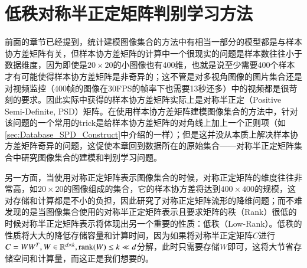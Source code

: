 \chapter{低秩对称半正定矩阵判别学习方法}
\label{chap:PSD_discrim_learning}
前面的章节已经提到，统计建模图像集合的方法中有相当一部分的模型都是与样本协方差矩阵有关，但样本协方差矩阵的计算中一个很现实的问题是样本数往往小于数据维度，因为即使是$20\times 20$的小图像也有400维，也就是说至少需要400个样本才有可能使得样本协方差矩阵是非奇异的；这不管是对多视角图像的图片集合还是对视频监控（400帧的图像在30FPS的帧率下也需要13秒还多）中的视频都是很苛刻的要求。因此实际中获得的样本协方差矩阵实际上是对称半正定（Positive Semi-Definite, PSD）矩阵。在使用样本协方差矩阵建模图像集合的方法中，针对该问题的一个常用的trick是给样本协方差矩阵的对角线上加上一个正则项（如\ref{sec:Database_SPD_Construct}中介绍的一样）；但是这并没从本质上解决样本协方差矩阵奇异的问题，这促使本章回到数据所在的原始集合——对称半正定矩阵集合中研究图像集合的建模和判别学习问题。

另一方面，当使用对称正定矩阵表示图像集合的时候，对称正定矩阵的维度往往非常高，如$20 \times 20$的图像组成的集合，它的样本协方差将达到$400\times 400$的规模，这对存储和计算都是不小的负担，因此\cite{Statistics_SPDML,Statistics_LEML}研究了对称正定矩阵流形的降维问题；而不难发现的是当图像集合使用的对称半正定矩阵表示且要求矩阵的秩（Rank）很低的时候对称半正定矩阵表示将体现出另一个重要的性质：低秩（Low-Rank）。低秩的性质将大大的降低存储容量和计算时间，因为如果将对称半正定矩阵$C$进行$C=WW^{T},W \in \mathbb{R}^{d\times k},{\rm rank}(W)\leq k \ll d$分解，此时只需要存储$W$即可，这将大节省存储空间和计算量，而这正是我们想要的。

